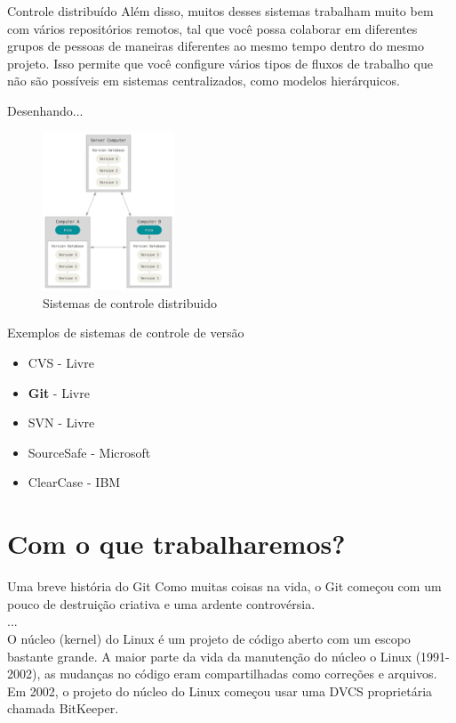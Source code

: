 \documentclass{beamer}
\begin{document}
\begin{frame}{Controle distribuído} \justifying
      Além disso, muitos desses sistemas trabalham muito bem com vários repositórios remotos, tal que você possa colaborar em diferentes grupos de pessoas de maneiras diferentes ao mesmo tempo dentro do mesmo projeto. Isso permite que você configure vários tipos de fluxos de trabalho que não são possíveis em sistemas centralizados, como modelos hierárquicos.
\end{frame}


\begin{frame}[fragile]{Desenhando...}
      \begin{figure}[H]
            \centerline{\includegraphics[width=0.35\textwidth]{assets/aula-tdsi-ifds-2023-05-24/controle-distribuido.png}}
            \caption{Sistemas de controle distribuido}
        \end{figure}
\end{frame}

\begin{frame}[fragile]{Exemplos de sistemas de controle de versão}

      \begin{itemize}
            \item CVS - Livre
            \item \textbf{Git} - Livre
            \item SVN - Livre
            \item SourceSafe - Microsoft
            \item ClearCase - IBM
            
      \end{itemize}
      \end{frame}

\section{Com o que trabalharemos?}
\begin{frame}{Uma breve história do Git} \justifying
      Como muitas coisas na vida, o Git começou com um pouco de destruição criativa e uma ardente controvérsia.
      \\...
      \\O núcleo (kernel) do Linux é um projeto de código aberto com um escopo bastante grande. A maior parte da vida da manutenção do núcleo o Linux (1991-2002), as mudanças no código eram compartilhadas como correções e arquivos. Em 2002, o projeto do núcleo do Linux começou usar uma DVCS proprietária chamada BitKeeper.
\end{frame}
\end{document}
